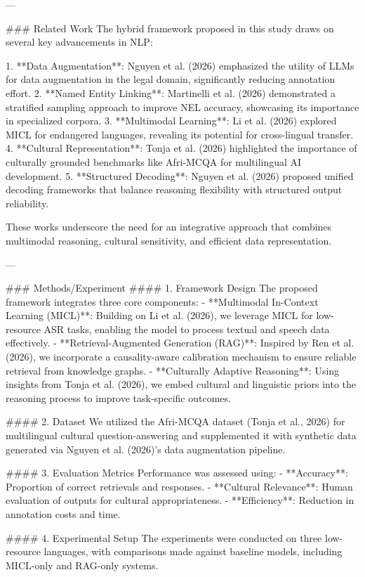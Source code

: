 ---

### Related Work
The hybrid framework proposed in this study draws on several key advancements in NLP:

1. **Data Augmentation**: Nguyen et al. (2026) emphasized the utility of LLMs for data augmentation in the legal domain, significantly reducing annotation effort.
2. **Named Entity Linking**: Martinelli et al. (2026) demonstrated a stratified sampling approach to improve NEL accuracy, showcasing its importance in specialized corpora.
3. **Multimodal Learning**: Li et al. (2026) explored MICL for endangered languages, revealing its potential for cross-lingual transfer.
4. **Cultural Representation**: Tonja et al. (2026) highlighted the importance of culturally grounded benchmarks like Afri-MCQA for multilingual AI development.
5. **Structured Decoding**: Nguyen et al. (2026) proposed unified decoding frameworks that balance reasoning flexibility with structured output reliability.

These works underscore the need for an integrative approach that combines multimodal reasoning, cultural sensitivity, and efficient data representation.

---

### Methods/Experiment
#### 1. Framework Design
The proposed framework integrates three core components:
- **Multimodal In-Context Learning (MICL)**: Building on Li et al. (2026), we leverage MICL for low-resource ASR tasks, enabling the model to process textual and speech data effectively.
- **Retrieval-Augmented Generation (RAG)**: Inspired by Ren et al. (2026), we incorporate a causality-aware calibration mechanism to ensure reliable retrieval from knowledge graphs.
- **Culturally Adaptive Reasoning**: Using insights from Tonja et al. (2026), we embed cultural and linguistic priors into the reasoning process to improve task-specific outcomes.

#### 2. Dataset
We utilized the Afri-MCQA dataset (Tonja et al., 2026) for multilingual cultural question-answering and supplemented it with synthetic data generated via Nguyen et al. (2026)'s data augmentation pipeline.

#### 3. Evaluation Metrics
Performance was assessed using:
- **Accuracy**: Proportion of correct retrievals and responses.
- **Cultural Relevance**: Human evaluation of outputs for cultural appropriateness.
- **Efficiency**: Reduction in annotation costs and time.

#### 4. Experimental Setup
The experiments were conducted on three low-resource languages, with comparisons made against baseline models, including MICL-only and RAG-only systems.

